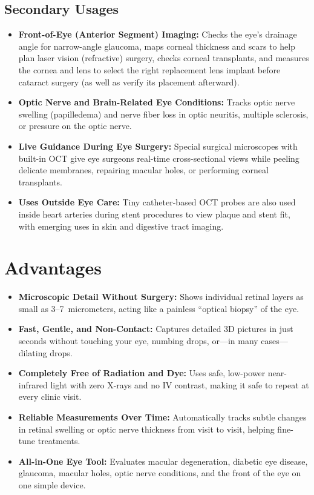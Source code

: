 \subsection{Secondary Usages}
\begin{itemize}
\item \textbf{Front-of-Eye (Anterior Segment) Imaging:} Checks the eye's drainage angle for narrow-angle glaucoma, maps corneal thickness and scars to help plan laser vision (refractive) surgery, checks corneal transplants, and measures the cornea and lens to select the right replacement lens implant before cataract surgery (as well as verify its placement afterward).
\item \textbf{Optic Nerve and Brain-Related Eye Conditions:} Tracks optic nerve swelling (papilledema) and nerve fiber loss in optic neuritis, multiple sclerosis, or pressure on the optic nerve.
\item \textbf{Live Guidance During Eye Surgery:} Special surgical microscopes with built-in OCT give eye surgeons real-time cross-sectional views while peeling delicate membranes, repairing macular holes, or performing corneal transplants.
\item \textbf{Uses Outside Eye Care:} Tiny catheter-based OCT probes are also used inside heart arteries during stent procedures to view plaque and stent fit, with emerging uses in skin and digestive tract imaging.
\end{itemize}

\section{Advantages}
\begin{itemize}
\item \textbf{Microscopic Detail Without Surgery:} Shows individual retinal layers as small as 3--7~micrometers, acting like a painless ``optical biopsy'' of the eye.
\item \textbf{Fast, Gentle, and Non-Contact:} Captures detailed 3D pictures in just seconds without touching your eye, numbing drops, or---in many cases---dilating drops.
\item \textbf{Completely Free of Radiation and Dye:} Uses safe, low-power near-infrared light with zero X-rays and no IV contrast, making it safe to repeat at every clinic visit.
\item \textbf{Reliable Measurements Over Time:} Automatically tracks subtle changes in retinal swelling or optic nerve thickness from visit to visit, helping fine-tune treatments.
\item \textbf{All-in-One Eye Tool:} Evaluates macular degeneration, diabetic eye disease, glaucoma, macular holes, optic nerve conditions, and the front of the eye on one simple device.
\end{itemize}

